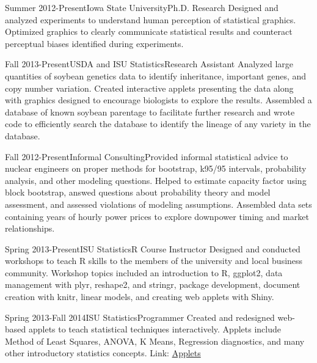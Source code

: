\documentclass[10pt]{tccv}
\begin{document}
\begin{eventlist}
% 

\item{Summer 2012-Present}{Iowa State University}{Ph.D. Research}{
Designed and analyzed experiments to understand human perception of statistical graphics. Optimized graphics to clearly communicate statistical results and counteract perceptual biases identified during experiments.\cite{sineillusionjcgs,jsm2014,jsm2014userpanel,jsm2013}}

\item{Fall 2013-Present}{USDA and ISU Statistics}{Research Assistant}{
Analyzed large quantities of soybean genetics data to identify inheritance, important genes, and copy number variation. Created interactive applets presenting the data along with graphics designed to encourage biologists to explore the results. Assembled a database of known soybean parentage to facilitate further research and wrote code to efficiently search the database to identify the lineage of any variety in the database. }

\item{Fall 2012-Present}{}{Informal Consulting}{Provided informal statistical advice to nuclear engineers on proper methods for bootstrap, k95/95 intervals, probability analysis, and other modeling questions. Helped to estimate capacity factor using block bootstrap, answed questions about probability theory and model assessment, and assessed violations of modeling assumptions. Assembled data sets containing years of hourly power prices to explore downpower timing and market relationships.}

\item{Spring 2013-Present}{ISU Statistics}{R Course Instructor}{
Designed and conducted workshops to teach R skills to the members of the university and local business community. Workshop topics included an introduction to R, ggplot2, data management with plyr, reshape2, and stringr, package development, document creation with knitr, linear models, and creating web applets with Shiny. }

\item{Spring 2013-Fall 2014}{ISU Statistics}{Programmer}{
Created and redesigned web-based applets to teach statistical techniques interactively. Applets include Method of Least Squares, ANOVA, K Means, Regression diagnostics, and many other introductory statistics concepts. Link: \href{http://vanderplas.dyndns-remote.com:3838/}{Applets}}


\end{eventlist}
\end{document}
